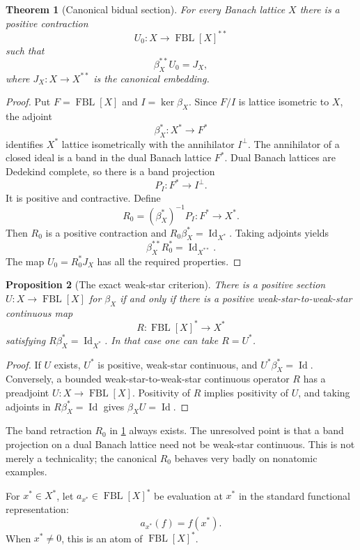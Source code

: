 \documentclass[11pt]{article}
\newtheorem{theorem}{Theorem}[section]
\newtheorem{proposition}[theorem]{Proposition}
\newcommand{\FBL}{\operatorname{FBL}}
\newcommand{\Id}{\operatorname{Id}}
\begin{document}
\begin{theorem}[Canonical bidual section]\label{thm:bidual}
For every Banach lattice $X$ there is a positive contraction
\[
 U_0:X\longrightarrow\FBL[X]^{**}
\]
such that
\[
 \beta_X^{**}U_0=J_X,
\]
where $J_X:X\to X^{**}$ is the canonical embedding.
\end{theorem}

\begin{proof}
Put $F=\FBL[X]$ and $I=\ker\beta_X$.  Since $F/I$ is lattice isometric to
$X$, the adjoint
\[
 \beta_X^*:X^*\longrightarrow F^*
\]
identifies $X^*$ lattice isometrically with the annihilator $I^\perp$.  The
annihilator of a closed ideal is a band in the dual Banach lattice $F^*$.
Dual Banach lattices are Dedekind complete, so there is a band projection
\[
 P_I:F^*\longrightarrow I^\perp.
\]
It is positive and contractive.  Define
\[
 R_0=(\beta_X^*)^{-1}P_I:F^*\longrightarrow X^*.
\]
Then $R_0$ is a positive contraction and $R_0\beta_X^*=\Id_{X^*}$.  Taking
adjoints yields
\[
 \beta_X^{**}R_0^*=\Id_{X^{**}}.
\]
The map $U_0=R_0^*J_X$ has all the required properties.
\end{proof}

\begin{proposition}[The exact weak-star criterion]\label{prop:wstar}
There is a positive section $U:X\to\FBL[X]$ for $\beta_X$ if and only if there
is a positive weak-star-to-weak-star continuous map
\[
 R:\FBL[X]^*\longrightarrow X^*
\]
satisfying $R\beta_X^*=\Id_{X^*}$.  In that case one can take $R=U^*$.
\end{proposition}

\begin{proof}
If $U$ exists, $U^*$ is positive, weak-star continuous, and
$U^*\beta_X^*=\Id$.  Conversely, a bounded weak-star-to-weak-star continuous
operator $R$ has a preadjoint $U:X\to\FBL[X]$.  Positivity of $R$ implies
positivity of $U$, and taking adjoints in $R\beta_X^*=\Id$ gives
$\beta_XU=\Id$.
\end{proof}

The band retraction $R_0$ in \cref{thm:bidual} always exists.  The unresolved
point is that a band projection on a dual Banach lattice need not be weak-star
continuous.  This is not merely a technicality; the canonical $R_0$ behaves
very badly on nonatomic examples.

For $x^*\in X^*$, let $a_{x^*}\in\FBL[X]^*$ be evaluation at $x^*$ in the
standard functional representation:
\[
 a_{x^*}(f)=f(x^*).
\]
When $x^*\neq0$, this is an atom of $\FBL[X]^*$.
\end{document}
